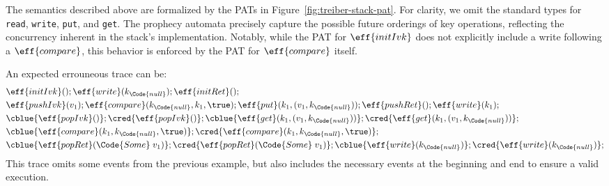 The semantics described above are formalized by the PATs in Figure~\ref{fig:treiber-stack-pat}. For clarity, we omit the standard types for \texttt{read}, \texttt{write}, \texttt{put}, and \texttt{get}. The prophecy automata precisely capture the possible future orderings of key operations, reflecting the concurrency inherent in the stack's implementation. Notably, while the PAT for $\eff{initIvk}$ does not explicitly include a write following a $\eff{compare}$, this behavior is enforced by the PAT for $\eff{compare}$ itself.

An expected errouneous trace can be:
\begin{align*}
    &\eff{initIvk}();\eff{write}(k_\Code{null});\eff{initRet}();\\
    &\eff{pushIvk}(v_1);\eff{compare}(k_\Code{null}, k_1, \true);\eff{put}(k_1, (v_1, k_\Code{null}));\eff{pushRet}();\eff{write}(k_1);\\
    &\cblue{\eff{popIvk}()};\cred{\eff{popIvk}()};\cblue{\eff{get}(k_1, (v_1, k_\Code{null}))};\cred{\eff{get}(k_1, (v_1, k_\Code{null}))};\\
    &\cblue{\eff{compare}(k_1, k_\Code{null}, \true)};\cred{\eff{compare}(k_1, k_\Code{null}, \true)};\\
    &\cblue{\eff{popRet}(\Code{Some}\;v_1)};\cred{\eff{popRet}(\Code{Some}\;v_1)};\cblue{\eff{write}(k_\Code{null})};\cred{\eff{write}(k_\Code{null})};
\end{align*}\noindent
This trace omits some events from the previous example, but also includes the necessary events at the beginning and end to ensure a valid execution.

